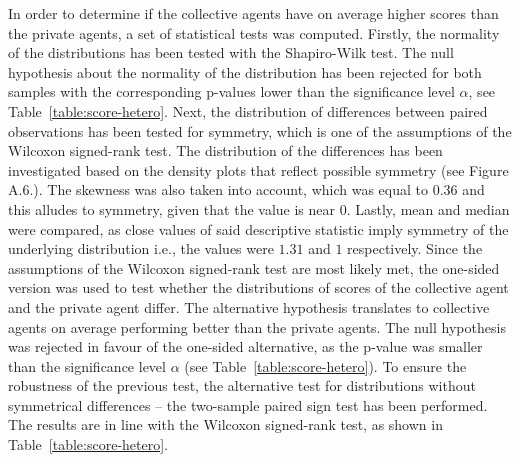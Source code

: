 \documentclass[preprint,12pt,authoryear]{elsarticle}
\begin{document}
In order to determine if the collective agents have on average higher scores than the private agents, a set of statistical tests was computed. Firstly, the normality of the distributions has been tested with the Shapiro-Wilk test. The null hypothesis about the normality of the distribution has been rejected for both samples with the corresponding p-values lower than the significance level $\alpha$, see Table~\ref{table:score-hetero}. Next, the distribution of differences between paired observations has been tested for symmetry, which is one of the assumptions of the Wilcoxon signed-rank test. The distribution of the differences has been investigated based on the density plots that reflect possible symmetry (see Figure A.6.). The skewness was also taken into account, which was equal to $0.36$ and this alludes to symmetry, given that the value is near $0$. Lastly, mean and median were compared, as close values of said descriptive statistic imply symmetry of the underlying distribution i.e., the values were $1.31$ and $1$ respectively. Since the assumptions of the Wilcoxon signed-rank test are most likely met, the one-sided version was used to test whether the distributions of scores of the collective agent and the private agent differ. The alternative hypothesis 
translates to collective agents on average performing better than the private agents. The null hypothesis was rejected in favour of the one-sided alternative, as the p-value was smaller than the significance level $\alpha$ (see Table~\ref{table:score-hetero}). To ensure the robustness of the previous test, the alternative test for distributions without symmetrical differences -- the two-sample paired sign test has been performed. The results are in line with the Wilcoxon signed-rank test, as shown in Table~\ref{table:score-hetero}.
\end{document}
